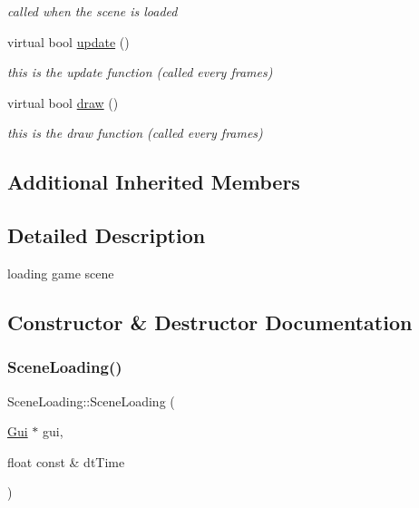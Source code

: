 \begin{DoxyCompactItemize}
\begin{DoxyCompactList}\small\item\em called when the scene is loaded \end{DoxyCompactList}\item 
virtual bool \hyperlink{class_scene_loading_a5b4f2b636e55908bb2f29180aa875201}{update} ()
\begin{DoxyCompactList}\small\item\em this is the update function (called every frames) \end{DoxyCompactList}\item 
virtual bool \hyperlink{class_scene_loading_ae51a1b4d4f738847d50036c174364f9e}{draw} ()
\begin{DoxyCompactList}\small\item\em this is the draw function (called every frames) \end{DoxyCompactList}\end{DoxyCompactItemize}
\subsection*{Additional Inherited Members}


\subsection{Detailed Description}
loading game scene 

\subsection{Constructor \& Destructor Documentation}
\mbox{\label{class_scene_loading_a26b7ef7d352763ba43bc5182652b6df4}} 
\subsubsection{\texorpdfstring{Scene\+Loading()}{SceneLoading()}\hspace{0.1cm}{\footnotesize\ttfamily [1/2]}}
{\footnotesize\ttfamily Scene\+Loading\+::\+Scene\+Loading (\begin{DoxyParamCaption}\item[{\hyperlink{class_gui}{Gui} $\ast$}]{gui,  }\item[{float const \&}]{dt\+Time }\end{DoxyParamCaption})}



